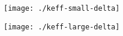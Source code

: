 \documentclass[11pt]{article}
\begin{document}
\begin{figure}[ht!]
    \centering
    \texttt{[image: ./keff-small-delta]}
\end{figure}
\begin{figure}[ht!]
    \centering
    \texttt{[image: ./keff-large-delta]}
  \end{figure} %









\end{document}
